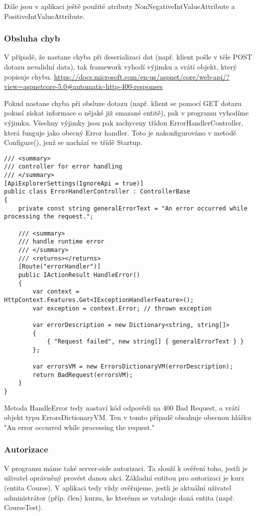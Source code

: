 Dále jsou v aplikaci ještě použité atributy NonNegativeIntValueAttribute a PositiveIntValueAttribute.


\subsubsection*{Obsluha chyb}

V případě, že nastane chyba při deserializaci dat (např. klient pošle v těle POST dotazu nevalidní data), tak framework vyhodí výjimku a vrátí objekt, který popisuje chybu. \url{https://docs.microsoft.com/en-us/aspnet/core/web-api/?view=aspnetcore-5.0#automatic-http-400-responses}

Pokud nastane chyba při obsluze dotazu (např. klient se pomocí GET dotazu pokusí získat informace o nějaké již smazané entitě), pak v programu vyhodíme výjimku. Všechny výjimky jsou pak zachyceny třídou ErrorHandlerController, která funguje jako obecný Error handler.
Toto je nakonfigurováno v metodě Configure(), jenž se nachází ve třídě Startup.
\begin{lstlisting}
/// <summary>
/// controller for error handling
/// </summary>
[ApiExplorerSettings(IgnoreApi = true)]
public class ErrorHandlerController : ControllerBase
{
	private const string generalErrorText = "An error occurred while processing the request.";
	
	/// <summary>
	/// handle runtime error
	/// </summary>
	/// <returns></returns>
	[Route("errorHandler")]
	public IActionResult HandleError()
	{
		var context = HttpContext.Features.Get<IExceptionHandlerFeature>();
		var exception = context.Error; // thrown exception
		
		var errorDescription = new Dictionary<string, string[]>
		{
			{ "Request failed", new string[] { generalErrorText } }
		};
		
		var errorsVM = new ErrorsDictionaryVM(errorDescription);
		return BadRequest(errorsVM);
	}
}
\end{lstlisting}
Metoda HandleError tedy nastaví kód odpovědi na 400 Bad Request, a vrátí objekt typu ErrorsDictionaryVM.
Ten v tomto případě obsahuje obecnou hlášku "An error occurred while processing the request."

\subsubsection*{Autorizace}

V programu máme také server-side autorizaci. Ta slouží k ověření toho, jestli je uživatel oprávněný provést danou akci. Základní entitou pro autorizaci je kurz (entita Course). V aplikaci tedy vždy ověřujeme, jestli je aktuální uživatel administrátor (příp. člen) kurzu, ke kterému se vztahuje daná entita (např. CourseTest).

